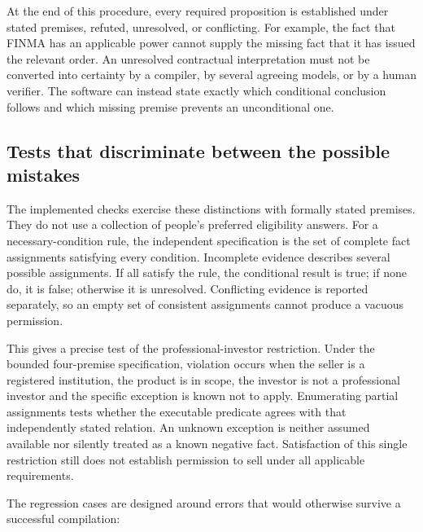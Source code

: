 At the end of this procedure, every required proposition is established under
stated premises, refuted, unresolved, or conflicting. For example, the fact
that FINMA has an applicable power cannot supply the missing fact that it has
issued the relevant order. An unresolved contractual interpretation must not
be converted into certainty by a compiler, by several agreeing models, or by
a human verifier. The software can instead state exactly which conditional
conclusion follows and which missing premise prevents an unconditional one.

\subsection{Tests that discriminate between the possible mistakes}

The implemented checks exercise these distinctions with formally stated
premises. They do not use a collection of people's preferred eligibility
answers. For a necessary-condition rule, the independent specification is the
set of complete fact assignments satisfying every condition. Incomplete
evidence describes several possible assignments. If all satisfy the rule, the
conditional result is true; if none do, it is false; otherwise it is unresolved.
Conflicting evidence is reported separately, so an empty set of consistent
assignments cannot produce a vacuous permission.

This gives a precise test of the professional-investor restriction. Under the
bounded four-premise specification, violation occurs when the seller is a
registered institution, the product is in scope, the investor is not a
professional investor and the specific exception is known not to apply.
Enumerating partial assignments tests whether the executable
predicate agrees with that independently stated relation. An unknown exception
is neither assumed available nor silently treated as a known negative fact.
Satisfaction of this single restriction still does not establish permission to
sell under all applicable requirements.

The regression cases are designed around errors that would otherwise survive
a successful compilation:


